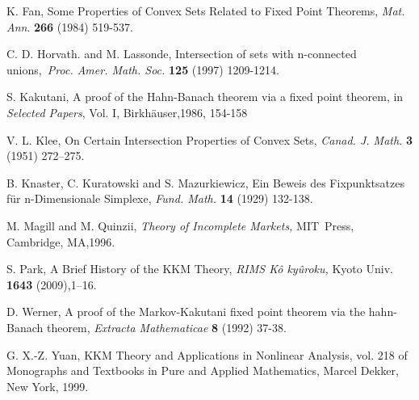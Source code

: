 \documentclass{article}
\begin{document}
\begin{thebibliography}{99}
 K. Fan, Some Properties of Convex Sets Related to Fixed Point
Theorems, \textit{Mat. Ann}. \textbf{266} (1984) 519-537.

 C. D. Horvath. and M. Lassonde, Intersection of sets with
n-connected unions,\textit{\ Proc. Amer. Math. Soc.} \textbf{125 }(1997)
1209-1214.

 S. Kakutani, A proof of the Hahn-Banach theorem via a fixed
point theorem, in \textit{Selected Papers}, Vol. I, Birkh\"{a}user,1986,
154-158

 V. L. Klee, On Certain Intersection Properties of Convex Sets, 
\textit{Canad. J. Math.} \textbf{3} (1951) 272--275.

 B. Knaster, C. Kuratowski and S. Mazurkiewicz, Ein Beweis des
Fixpunktsatzes f\"{u}r n-Dimensionale Simplexe, \textit{Fund. Math. }\textbf{%
14} (1929) 132-138.

 M. Magill and M. Quinzii, \textit{Theory of Incomplete Markets,}
MIT\ Press, Cambridge, MA,1996.

 S. Park, A Brief History of the KKM Theory, \textit{RIMS K\^{o}%
ky\^{u}roku,} Kyoto Univ. \textbf{1643} (2009),1--16.

 D. Werner, A proof of the Markov-Kakutani fixed point theorem
via the hahn-Banach theorem, \textit{Extracta Mathematicae} \textbf{8}
(1992) 37-38.

 G. X.-Z. Yuan, KKM Theory and Applications in Nonlinear
Analysis, vol. 218 of Monographs and Textbooks in Pure and Applied
Mathematics, Marcel Dekker, New York, 1999.
\end{thebibliography}
\end{document}
